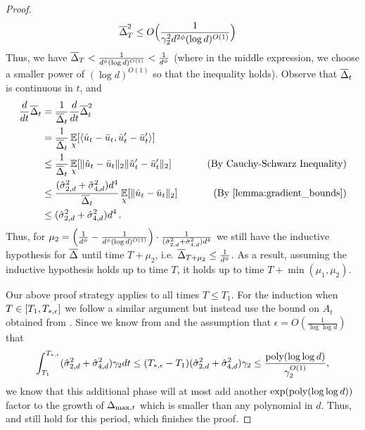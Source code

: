 \begin{proof}
\begin{align} \label{eq:induction_2}
\overline{\Delta}_T^2 
& \leq O\Big(\frac{1}{\gamma_2^2 d^{2\phi} (\log d)^{O(1)}}\Big)
\end{align}
Thus, we have $\overline{\Delta}_T < \frac{1}{d^{\phi} (\log d)^{O(1)}} < \frac{1}{d^\phi}$ (where in the middle expression, we choose a smaller power of $(\log d)^{O(1)}$ so that the inequality holds). Observe that $\overline{\Delta}_t$ is continuous in $t$, and
\begin{align}
\frac{d}{dt} \deltaBar_t
& = \frac{1}{\deltaBar_t} \frac{d}{dt} \deltaBar_t^2 \\
& = \frac{1}{\deltaBar_t} \E_{\chi} [\langle \uhat_t - \ubar_t, \uhat_t' - \ubar_t' \rangle] \\
& \leq \frac{1}{\deltaBar_t} \E_{\chi} [\|\uhat_t - \ubar_t\|_2 \|\uhat_t' - \ubar_t'\|_2]
& \tag{By Cauchy-Schwarz Inequality} \\
& \leq \frac{(\sigmaCoeffTwo^2 + \sigmaCoeffFour^2) d^4}{\deltaBar_t} \E_{\chi} [\|\uhat_t - \ubar_t\|_2]
& \tag{By \Cref{lemma:gradient_bounds}} \\
& \leq (\sigmaCoeffTwo^2 + \sigmaCoeffFour^2) d^4 \period
\end{align}
Thus, for $\mu_2 = \Big(\frac{1}{d^\phi} - \frac{1}{d^\phi (\log d)^{O(1)}}\Big) \cdot \frac{1}{(\hat{\sigma}_{2, d}^2 + \hat{\sigma}_{4, d}^2) d^4}$ we still have the inductive hypothesis for $\overline{\Delta}$ until time $T + \mu_2$, i.e. $\overline{\Delta}_{T + \mu_2} \leq \frac{1}{d^\phi}$. As a result, assuming the inductive hypothesis holds up to time $T$, it holds up to time $T + \min(\mu_1, \mu_2)$.

Our above proof strategy applies to all times $T \leq T_1$. For the induction when $T \in [T_1, T_{*, \epsilon}]$ we follow a similar argument but instead use the bound on $A_t$ obtained from . Since we know from  and the assumption that $\epsilon = O(\frac{1}{\log \log d})$ that
\begin{align}
	\int_{T_1}^{T_{*, \epsilon}} (\hat{\sigma}_{2, d}^2 + \hat{\sigma}_{4, d}^2)\gamma_2 dt \le (T_{*, \epsilon} - T_1)(\hat{\sigma}_{2, d}^2 + \hat{\sigma}_{4, d}^2)\gamma_2 \le \frac{\textup{poly}(\log \log d)}{\gamma_2^{O(1)}},
\end{align}
we know that this additional phase will at most add another $\exp(\textup{poly}(\log \log d))$ factor to the growth of $\Delta_{\textup{max}, t}$ which is smaller than any polynomial in $d$. Thus,  and  still hold for this period, which finishes the proof.
\end{proof}

